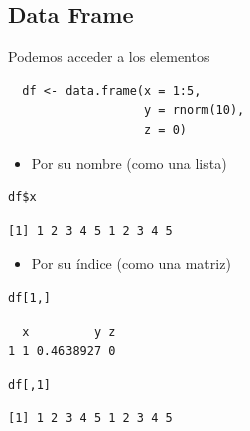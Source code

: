 \documentclass[xcolor={usenames,svgnames,dvipsnames}]{beamer}
\begin{document}
\subsection{Data Frame}
\label{sec:org820258a}
\begin{frame}[fragile,label={sec:orgd35cb22}]{Podemos acceder a los elementos}
 \lstset{language=r,label= ,caption= ,captionpos=b,numbers=none}
\begin{lstlisting}
  df <- data.frame(x = 1:5,
                   y = rnorm(10),
                   z = 0)
\end{lstlisting}

\begin{itemize}
\item Por su nombre (como una lista)
\end{itemize}
\lstset{language=r,label= ,caption= ,captionpos=b,numbers=none}
\begin{lstlisting}
df$x
\end{lstlisting}

\begin{verbatim}
[1] 1 2 3 4 5 1 2 3 4 5
\end{verbatim}

\begin{itemize}
\item Por su índice (como una matriz)
\end{itemize}
\lstset{language=r,label= ,caption= ,captionpos=b,numbers=none}
\begin{lstlisting}
df[1,]
\end{lstlisting}

\begin{verbatim}
  x         y z
1 1 0.4638927 0
\end{verbatim}

\lstset{language=r,label= ,caption= ,captionpos=b,numbers=none}
\begin{lstlisting}
df[,1]
\end{lstlisting}

\begin{verbatim}
[1] 1 2 3 4 5 1 2 3 4 5
\end{verbatim}
\end{frame}
\end{document}
